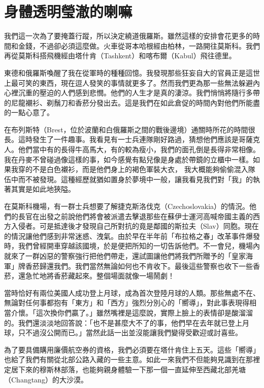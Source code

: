\chapter{身體透明瑩澈的喇嘛}

我們這一次為了要掩蓋行蹤，所以決定繞道俄羅斯。雖然這樣的安排會花更多的時間和金錢，不過卻必須這麼做。火車從哥本哈根經由柏林，一路開往莫斯科。我們再從莫斯科搭飛機經由塔什肯（Tashkent）和喀布爾（Kabul）飛往德里。

東德和俄羅斯喚醒了我在從軍時的種種回憶。我發現那些狂妄自大的官員正是這世上最可笑的東西，現在逗人發笑的事情就更多了。然而我們更為那一些無法躲避內心裡沉重的壓迫的人們感到悲憫。他們的人生才是真的淒涼。我們悄悄將隨行多帶的尼龍襯衫、剃鬚刀和香菸分發出去。這是我們在如此倉促的時間內對他們所能盡的一點心意了。

在布列斯特（Brest，位於波蘭和白俄羅斯之間的戰後邊境）通關時所花的時間很長。這時發生了一件趣事。我看見有一士兵連隊剛好路過，猜想他們應該是哥薩克人。他們當中有的長得牛高馬大，有的較為瘦小，我們的面孔倒是長得非常相像。我在丹麥不曾碰過像這樣的事，如今感覺有點兒像是身處於帶鏡的立櫃中一樣。如果我穿的不是白色襯衫，而是他們身上的褐色軍裝大衣，%
我大概能夠偷偷混入隊伍中而不被發現。這種經歷就猶如置身於夢境中一般，讓我看見我們對「我」的執著其實是如此地狹隘。

在莫斯科機場，有一群士兵想要了解捷克斯洛伐克（Czechoslovakia）的情況。他們的長官在出發之前說他們將會被派遣去擊退那些在蘇伊士運河高喊帝國主義的西方入侵者。可是抵達後才發現自己所對抗的竟是鄰國的斯拉夫（Slav）同胞。現在的情況讓他們感到非常迷惑、洩氣。由於早在半年前「布拉格之春」改革事件爆發時，我們曾經開車穿越該國境，於是便把所知的一切告訴他們。不一會兒，機場內就來了一群凶惡的警察強行把他們帶走，還試圖讓他們將我們所贈予的「皇家海軍」牌香菸歸還我們。我們當然無論如何也不肯收下。最後這些警察也收下一些香菸，還急忙地將香菸藏起來。整個場面就像一場鬧劇！

當時恰好有兩位美國人成功登上月球，成為首次登陸月球的人類。那些無處不在、無論對任何事都抱有「東方」和「西方」強烈分別心的「嚮導」，對此事表現得相當介懷。「這次換你們贏了。」雖然嘴裡是這麼說，實際上臉上的表情卻是酸溜溜的。我們還淡淡地回答說：「也不是甚麼大不了的事，他們早在去年就已登上月球，只不過沒公開而已。」當然此話一出並沒能讓我們變得受歡迎或討喜些。

為了要具備購用廉價航空券的資格，我們必須要在塔什肯住上五天。這些「嚮導」也給了我們有關從北部公路入藏的一些主意。如此一來我們不但能夠見識到在那裡定居下來的穆斯林部落，也能夠親身體驗一下那一個一直延伸至西藏北部羌塘（Changtang）的大沙漠。

